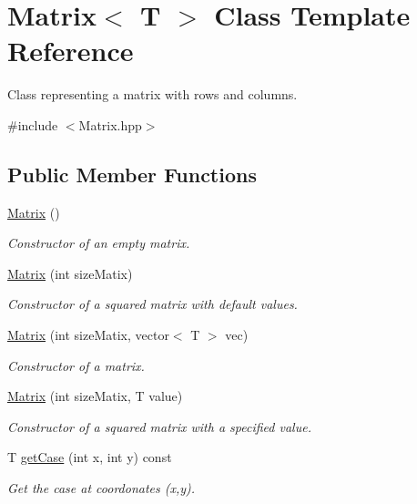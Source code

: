 \hypertarget{class_matrix}{}\section{Matrix$<$ T $>$ Class Template Reference}
\label{class_matrix}


Class representing a matrix with rows and columns.  




{\ttfamily \#include $<$Matrix.\+hpp$>$}

\subsection*{Public Member Functions}
\begin{DoxyCompactItemize}
\item 
\mbox{\hyperlink{class_matrix_a9d567e3a121b1be0c3f9c461cab524fe}{Matrix}} ()
\begin{DoxyCompactList}\small\item\em Constructor of an empty matrix. \end{DoxyCompactList}\item 
\mbox{\hyperlink{class_matrix_a7ba0bf11676bcda31c984a960dd0ced5}{Matrix}} (int size\+Matix)
\begin{DoxyCompactList}\small\item\em Constructor of a squared matrix with default values. \end{DoxyCompactList}\item 
\mbox{\hyperlink{class_matrix_ab2de60d5fd982131f2c83f2e0a935538}{Matrix}} (int size\+Matix, vector$<$ T $>$ vec)
\begin{DoxyCompactList}\small\item\em Constructor of a matrix. \end{DoxyCompactList}\item 
\mbox{\hyperlink{class_matrix_a4acc237a876c994c947079f7a0b9a148}{Matrix}} (int size\+Matix, T value)
\begin{DoxyCompactList}\small\item\em Constructor of a squared matrix with a specified value. \end{DoxyCompactList}\item 
T \mbox{\hyperlink{class_matrix_afc8b612ca8e7afb5466a516694d4227b}{get\+Case}} (int x, int y) const
\begin{DoxyCompactList}\small\item\em Get the case at coordonates (x,y). \end{DoxyCompactList}\item 

\end{DoxyCompactItemize}
